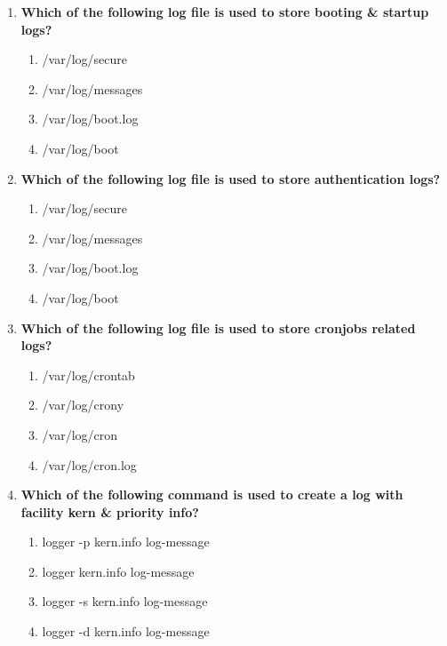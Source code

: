 \begin{flushleft}
\begin{enumerate}
		\item \textbf{Which of the following log file is used to store booting \& startup logs?}
		\begin{enumerate}[label=(\alph*)]
			\item /var/log/secure
			\item /var/log/messages
			\item /var/log/boot.log  %
			\item /var/log/boot   
		\end{enumerate}
		\bigskip
		\bigskip	

		\item \textbf{Which of the following log file is used to store authentication logs?}
		\begin{enumerate}[label=(\alph*)]
			\item /var/log/secure     %
			\item /var/log/messages
			\item /var/log/boot.log  
			\item /var/log/boot   
		\end{enumerate}
		\bigskip
		\bigskip	

		\item \textbf{Which of the following log file is used to store cronjobs related logs?}
		\begin{enumerate}[label=(\alph*)]
			\item /var/log/crontab
			\item /var/log/crony
			\item /var/log/cron   %
			\item /var/log/cron.log
		\end{enumerate}
		\bigskip
		\bigskip	

		\item \textbf{Which of the following command is used to create a log with facility kern \& priority info?}
		\begin{enumerate}[label=(\alph*)]
			\item logger -p kern.info  log-message  %
			\item logger kern.info  log-message
			\item logger -s kern.info  log-message
			\item logger -d kern.info  log-message
		\end{enumerate}
	\end{enumerate}
\end{flushleft}

